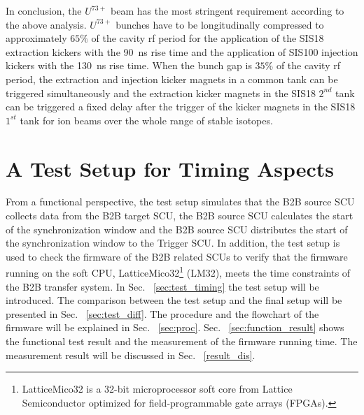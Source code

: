 In conclusion, the $U^\mathit{73+}$ beam has the most stringent requirement according to the above analysis. $U^\mathit{73+}$ bunches have to be longitudinally compressed to approximately $65\%$ of the cavity rf period for the application of the SIS18 extraction kickers with the \SI{90}{ns} rise time and the application of SIS100 injection kickers with the \SI{130}{ns} rise time. When the bunch gap is $35\%$ of the cavity rf period, the extraction and injection kicker magnets in a common tank can be triggered simultaneously and the extraction kicker magnets in the SIS18 $2^{nd}$ tank can be triggered a fixed delay after the trigger of the kicker magnets in the SIS18  $1^{st}$ tank for ion beams over the whole range of stable isotopes.
\section{A Test Setup for Timing Aspects}
\label{real_test}

From a functional perspective, the test setup simulates that the B2B source SCU collects data from the B2B target SCU, the B2B source SCU calculates the start of the synchronization window and the B2B source SCU distributes the start of the synchronization window to the Trigger SCU. In addition, the test setup is used to check the firmware of the B2B related SCUs to verify that the firmware running on the soft CPU, LatticeMico32\footnote{LatticeMico32 is a 32-bit microprocessor soft core from Lattice Semiconductor optimized for field-programmable gate arrays (\gls{FPGA}s).} (\gls{LM32}), meets the time constraints of the B2B transfer system.  In Sec. ~\ref{sec:test_timing} the test setup will be introduced. The comparison between the test setup and the final setup will be presented in Sec. ~\ref{sec:test_diff}. The procedure and the flowchart of the firmware will be explained in Sec. ~\ref{sec:proc}. Sec. ~\ref{sec:function_result} shows the functional test result and the measurement of the firmware running time. The measurement result will be discussed in Sec. ~\ref{result_dis}.  

